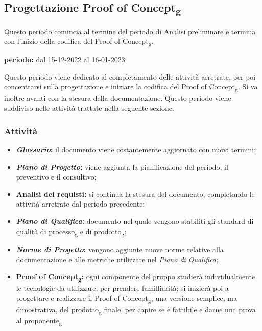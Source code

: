 \subsection{Progettazione Proof of Concept\textsubscript{g}}
Questo periodo comincia al termine del periodo di Analisi preliminare e termina con l'inizio della codifica del Proof of Concept\textsubscript{g}.\\
\begin{center}
\textbf{periodo:} dal 15-12-2022 al 16-01-2023\\
\end{center}
Questo periodo viene dedicato al completamento delle attività arretrate, per poi concentrarsi sulla 
progettazione e iniziare la codifica del Proof of Concept\textsubscript{g}. Si va inoltre avanti con la stesura 
della documentazione. Questo periodo viene suddiviso nelle attività trattate nella seguente sezione.

\subsubsection{Attività}
\begin{itemize}
\item \textbf{\textit{Glossario}:} il documento viene costantemente aggiornato con nuovi termini;
\item \textbf{\textit{Piano di Progetto}:} viene aggiunta la pianificazione del periodo, il preventivo e il consultivo;  
\item \textbf{Analisi dei requisti:} si continua la stesura del documento, completando le attività arretrate dal periodo precedente;
\item \textbf{\textit{Piano di Qualifica}:} documento nel quale vengono stabiliti gli standard di qualità di processo\textsubscript{g} e di prodotto\textsubscript{g};
\item \textbf{\textit{Norme di Progetto}:} vengono aggiunte nuove norme relative alla documentazione e alle metriche utilizzate nel \textit{Piano di Qualifica};
\item \textbf{Proof of Concept\textsubscript{g}:} ogni componente del gruppo studierà individualmente le tecnologie da utilizzare, per prendere familliarità; si inizierà poi a progettare e realizzare il Proof of Concept\textsubscript{g}, una versione semplice, ma dimostrativa, del prodotto\textsubscript{g} finale, per 
capire se è fattibile e darne una prova al proponente\textsubscript{g}.
\end{itemize}


